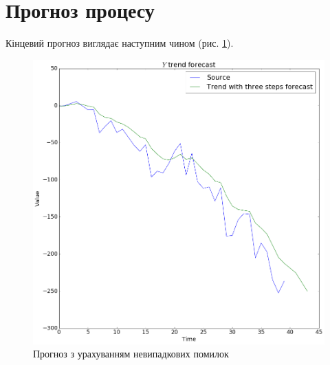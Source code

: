 \section{Прогноз процесу}
Кінцевий прогноз виглядає наступним чином
(рис. \ref{fig:forecast:with_errors}).
\begin{figure}[h!]
  \centering
  \includegraphics[width=\textwidth]{Coursework_files/Coursework_42_0.png}
  \caption{Прогноз з урахуванням невипадкових помилок}
  \label{fig:forecast:with_errors}
\end{figure}

